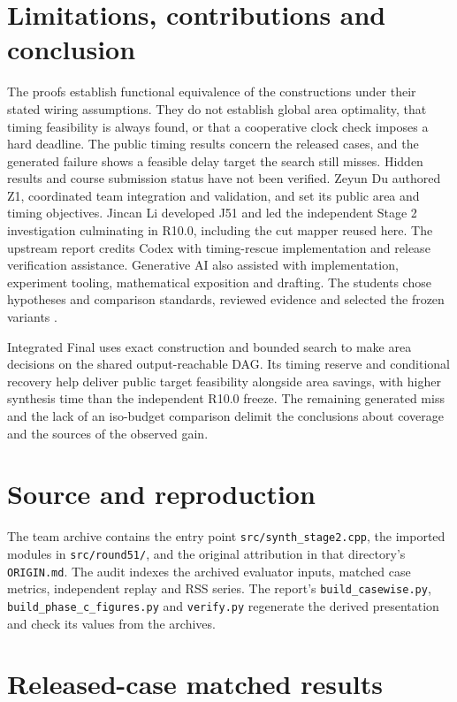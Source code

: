 \documentclass[journal,10pt]{IEEEtran}
\begin{document}
\section{Limitations, contributions and conclusion}
The proofs establish functional equivalence of the constructions under their stated wiring assumptions. They do not establish global area optimality, that timing feasibility is always found, or that a cooperative clock check imposes a hard deadline. The public timing results concern the released cases, and the generated failure shows a feasible delay target the search still misses. Hidden results and course submission status have not been verified.
Zeyun Du authored Z1, coordinated team integration and validation, and set its public area and timing objectives. Jincan Li developed J51 and led the independent Stage 2 investigation culminating in R10.0, including the cut mapper reused here. The upstream report credits Codex with timing-rescue implementation and release verification assistance. Generative AI also assisted with implementation, experiment tooling, mathematical exposition and drafting. The students chose hypotheses and comparison standards, reviewed evidence and selected the frozen variants \cite{stage2trial,stage2integration}.

Integrated Final uses exact construction and bounded search to make area decisions on the shared output-reachable DAG. Its timing reserve and conditional recovery help deliver public target feasibility alongside area savings, with higher synthesis time than the independent R10.0 freeze. The remaining generated miss and the lack of an iso-budget comparison delimit the conclusions about coverage and the sources of the observed gain.

\section*{Source and reproduction}
The team archive contains the entry point \nolinkurl{src/synth_stage2.cpp}, the imported modules in \nolinkurl{src/round51/}, and the original attribution in that directory's \nolinkurl{ORIGIN.md}. The audit indexes the archived evaluator inputs, matched case metrics, independent replay and RSS series. The report's \nolinkurl{build_casewise.py}, \nolinkurl{build_phase_c_figures.py} and \nolinkurl{verify.py} regenerate the derived presentation and check its values from the archives.

\balance



\clearpage
\onecolumn
\raggedbottom
\appendices
\section{Released-case matched results}
\label{sec:appendix}
\PhaseCCasewise
\end{document}
